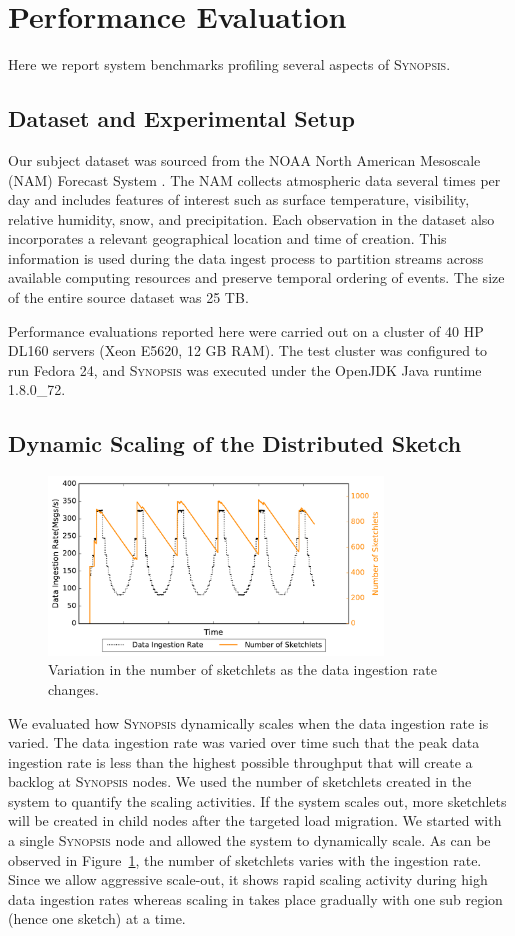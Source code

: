 \section{Performance Evaluation}
Here we report system benchmarks profiling several aspects of \textsc{Synopsis}.
\label{sec:performance}
\subsection{Dataset and Experimental Setup}
Our subject dataset was sourced from the NOAA North American Mesoscale (NAM) Forecast System \cite{noaa_nam}.  The NAM collects atmospheric data several times per day and includes features of interest such as surface temperature, visibility, relative humidity, snow, and precipitation. Each observation in the dataset also incorporates a relevant geographical location and time of creation. This information is used during the data ingest process to partition streams across available computing resources and preserve temporal ordering of events. The size of the entire source dataset was 25 TB.

Performance evaluations reported here were carried out on a cluster of 40 HP DL160 servers (Xeon E5620, 12 GB RAM). The test cluster was configured to run Fedora 24, and \textsc{Synopsis} was executed under the OpenJDK Java runtime 1.8.0\_72.

\subsection{Dynamic Scaling of the Distributed Sketch}
\begin{figure}
    \centerline{\includegraphics[width=3.5in]{figures/dyn-scaling.pdf}}
    \caption{Variation in the number of sketchlets as the data ingestion rate changes.}
    \label{fig:dyn-scaling}
\end{figure}
We evaluated how \textsc{Synopsis} dynamically scales when the data ingestion rate is varied.
The data ingestion rate was varied over time such that the peak data ingestion rate is less than the highest possible throughput that will create a backlog at \textsc{Synopsis} nodes.
We used the number of sketchlets created in the system to quantify the scaling activities.
If the system scales out, more sketchlets will be created in child nodes after the targeted load migration.
We started with a single \textsc{Synopsis} node and allowed the system to dynamically scale.
As can be observed in Figure~\ref{fig:dyn-scaling}, the number of sketchlets varies with the ingestion rate.
Since we allow aggressive scale-out, it shows rapid scaling activity during high data ingestion rates whereas scaling in takes place gradually with one sub region (hence one sketch) at a time.

